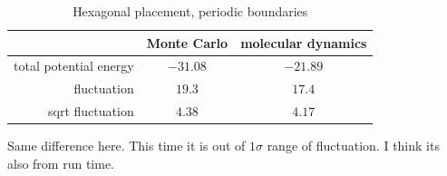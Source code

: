 \documentclass[UTF8,a4paper]{article}
\begin{document}
\begin{table}[H]
	\centering
	\caption{Hexagonal placement, periodic boundaries}
	\begin{tabular}{rcc}
		\toprule
		\toprule
		                       & Monte Carlo & molecular dynamics \\ \midrule
		total potential energy & $-31.08$    & $-21.89$           \\
		fluctuation            & $19.3$      & $17.4$             \\
		sqrt fluctuation       & $4.38$      & $4.17$             \\
		\bottomrule
	\end{tabular}%
	\label{tab:rand_hard_2}%
\end{table}%
Same difference here. This time it is out of $1\sigma$ range of fluctuation. I think its also from run time.
\end{document}
